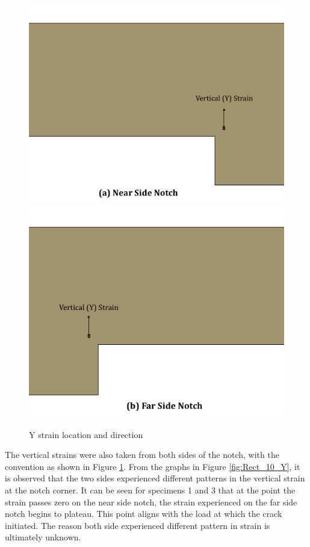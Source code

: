 \documentclass[11pt,a4paper]{article}
\numberwithin{equation}{subsection}
\begin{document}
\begin{figure}[h]
	\begin{center}
		\includegraphics[scale=0.35]{Ver_Near}
		\includegraphics[scale=0.35]{Ver_Far}
	\end{center}
	\caption{Y strain location and direction}
	\label{fig:Ver}
\end{figure}
\pagebreak

\noindent
The vertical strains were also taken from both sides of the notch, with the convention as shown in Figure \ref{fig:Ver}. From the graphs in Figure \ref{fig:Rect_10_Y}, it is observed that the two sides experienced different patterns in the vertical strain at the notch corner. It can be seen for specimens 1 and 3 that at the point the strain passes zero on the near side notch, the strain experienced on the far side notch begins to plateau. This point aligns with the load at which the crack initiated. The reason both side experienced different pattern in strain is ultimately unknown. 
\end{document}
